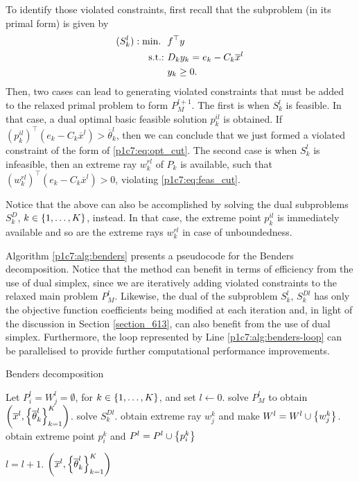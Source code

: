To identify those violated constraints, first recall that the subproblem (in its primal form) is given by
%
\begin{align*}
	(S_k^l): \mathop{\text{min.~}} \ & f^\top y \\
	\mathop{\text{s.t.:~}} & D_k y_k = e_k - C_k \overline{x}^l \\
	& y_k \geq 0.
\end{align*}
%
Then, two cases can lead to generating violated constraints that must be added to the relaxed primal problem to form $P_M^{l+1}$. The first is when $S_k^l$ is feasible. In that case, a dual optimal basic feasible solution $p^{il}_{k}$ is obtained. If $(p^{il}_k)^\top(e_k - C_k \overline{x}^l) > \overline{\theta}_k^l$, then we can conclude that we just formed a violated constraint of the form of \eqref{p1c7:eq:opt_cut}. The second case is when $S_k^l$ is infeasible, then an extreme ray $w^{rl}_k$ of $P_k$ is available, such that $(w^{rl}_k)^\top(e_k - C_k \overline{x}^l) > 0$, violating \eqref{p1c7:eq:feas_cut}. 

Notice that the above can also be accomplished by solving the dual subproblems $S^D_k$, $k \in \left\{ 1, \dots, K \right \}$, instead. In that case, the extreme point $p^{il}_k$ is immediately available and so are the extreme rays $w^{rl}_k$ in case of unboundedness.

Algorithm \ref{p1c7:alg:benders} presents a pseudocode for the Benders decomposition. Notice that the method can benefit in terms of efficiency from the use of dual simplex, since we are iteratively adding violated constraints to the relaxed main problem $P_M^l$. Likewise, the dual of the subproblem $S_k^l$, $S_k^{Dl}$ has only the objective function coefficients being modified at each iteration and, in light of the discussion in Section \ref{section_613}, can also benefit from the use of dual simplex. Furthermore, the loop represented by Line \ref{p1c7:alg:benders-loop} can be parallelised to provide further computational performance improvements. 

\begin{algorithm}[H]
    \caption{Benders decomposition} \label{p1c7:alg:benders}
    \begin{algorithmic}[1] %
    Let $P_i^l = W_j^l = \emptyset$, for $k \in \left\{ 1,\dots,K \right \}$, and set
    $l \gets 0$. 
    \Repeat 
        \State solve $P_M^l$ to obtain $\left(\overline{x}^l, \left\{ \overline{\theta}_k^l \right \}_{k=1}^K\right)$. 
         \label{p1c7:alg:benders-loop}
            \State solve $S_k^{Dl}$.
            	\State obtain extreme ray $w_j^k$ and make $W^l = W^l \cup \left\{ w_j^k \right \}$.
            \Else
            	\State obtain extreme point $p_i^k$ and $P^l = P^l \cup \left\{ p_i^k \right \}$
            \EndIf  
        \EndFor
 
        \State $l = l + 1$.        	
     $\left(\overline{x}^l, \left\{ \overline{\theta}_k^l \right \}_{k=1}^K\right)$
  \end{algorithmic}
\end{algorithm}

